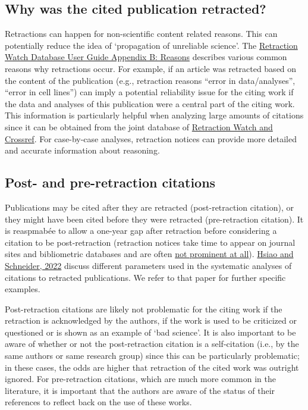 \documentclass[letterpaper, 12pt]{article}
\begin{document}
\subsection*{Why was the cited publication retracted?} 

Retractions can happen for non-scientific content related reasons. This can potentially reduce the idea of ‘propagation of unreliable science’. The \href{https://retractionwatch.com/retraction-watch-database-user-guide/retraction-watch-database-user-guide-appendix-b-reasons/}{Retraction Watch Database User Guide Appendix B: Reasons} describes various common reasons why retractions occur. For example, if an article was retracted based on the content of the publication (e.g., retraction reasons ``error in data/analyses'', ``error in cell lines'') can imply a potential reliability issue for the citing work if the data and analyses of this publication were a central part of the citing work. This information is particularly helpful when analyzing large amounts of citations since it can be obtained from the joint database of \href{https://gitlab.com/crossref/retraction-watch-data}{Retraction Watch and Crossref}. For case-by-case analyses, retraction notices can provide more detailed and accurate information about reasoning. 

\subsection*{Post- and pre-retraction citations}

Publications may be cited after they are retracted (post-retraction citation), or they might have been cited before they were retracted (pre-retraction citation). 
It is reaspmabée to allow a one-year gap after retraction before considering a citation to be post-retraction (retraction notices take time to appear on journal sites and bibliometric databases and are often \href{https://retractionwatch.com/2024/07/05/how-you-can-help-improve-the-visibility-of-retractions-introducing-nisos-recommended-practice-for-communication-of-retractions-removals-and-expressions-of-concern-crec/}{not prominent at all}). \href{ https://doi.org/10.1162/qss_a_00155}{Hsiao and Schneider, 2022} discuss different parameters used in the systematic analyses of citations to retracted publications. We refer to that paper for further specific examples.  

Post-retraction citations are likely not problematic for the citing work if the retraction is acknowledged by the authors, if the work is used to be criticized or questioned or is shown as an example of `bad science'. It is also important to be aware of whether or not the post-retraction citation is a self-citation (i.e., by the same authors or same research group) since this can be particularly problematic; in these cases, the odds are higher that retraction of the cited work was outright ignored. For pre-retraction citations, which are much more common in the literature, it is important that the authors are aware of the status of their references to reflect back on the use of these works. 
\end{document}
